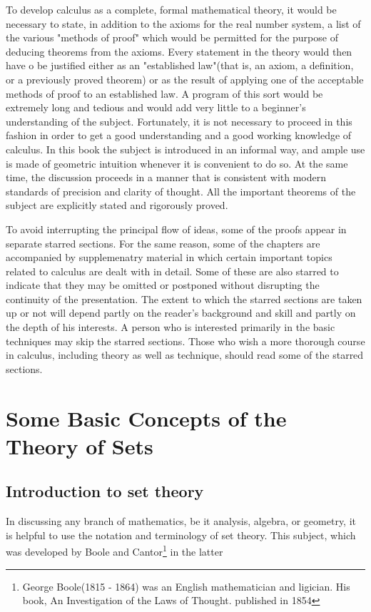\documentclass[cn,11pt,chinese]{elegantbook}
\numberwithin{equation}{section}
\begin{document}
To develop calculus as a complete, formal mathematical theory, it would be necessary to state, in addition to the axioms for the real number system, a list of the various "methods of proof" which would be permitted for the purpose of deducing theorems from the axioms. Every statement in the theory would then have o be justified either as an "established law"(that is, an axiom, a definition, or a previously proved theorem) or as the result of applying one of the acceptable methods of proof to an established law. A program of this sort would be extremely long and tedious and would add very little to a beginner's understanding of the subject. Fortunately, it is not necessary to proceed in this fashion in order to get a good understanding and a good working knowledge of calculus. In this book the subject is introduced in an informal way, and ample use is made of geometric intuition whenever it is convenient to do so. At the same time, the discussion proceeds in a manner that is consistent with modern standards of precision and clarity of thought. All the important theorems of the subject are explicitly stated and rigorously proved.

To avoid interrupting the principal flow of ideas, some of the proofs appear in separate starred sections. For the same reason, some of the chapters are accompanied by supplemenatry material in which certain important topics related to calculus are dealt with in detail. Some of these are also starred to indicate that they may be omitted or postponed without disrupting the continuity of the presentation. The extent to which the starred sections are taken up or not will depend partly on the reader's background and skill and partly on the depth of his interests. A person who is interested primarily in the basic techniques may skip the starred sections. Those who wish a more thorough course in calculus, including theory as well as technique, should read some of the starred sections.



\section{Some Basic Concepts of the Theory of Sets}\label{section00102}

\subsection{Introduction to set theory}
In discussing any branch of mathematics, be it analysis, algebra, or geometry, it is helpful to use the notation and terminology of set theory. This subject, which was developed by Boole and Cantor\footnote{George Boole(1815 - 1864) was an English mathematician and ligician. His book, An Investigation of the Laws of Thought. published in 1854} in the latter
\end{document}

